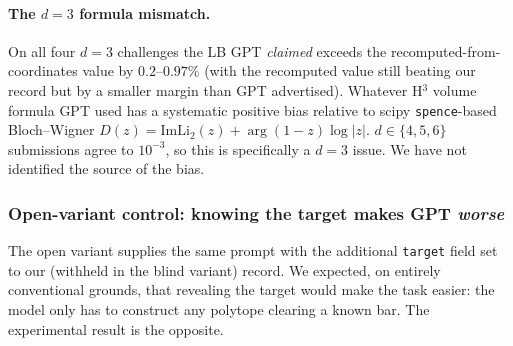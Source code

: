 \documentclass[11pt]{article}
\begin{document}
\paragraph{The $d = 3$ formula mismatch.}
On all four $d = 3$ challenges the LB GPT \emph{claimed} exceeds
the recomputed-from-coordinates value by $0.2$--$0.97\%$ (with
the recomputed value still beating our record but by a smaller
margin than GPT advertised).  Whatever H$^3$ volume formula
GPT used has a systematic positive bias relative to scipy
\texttt{spence}-based Bloch--Wigner $D(z) = \mathrm{Im} \mathrm{Li}_2(z) +
\arg(1{-}z) \log|z|$.  $d \in \{4, 5, 6\}$ submissions agree to
$10^{-3}$, so this is specifically a $d = 3$ issue.  We have not
identified the source of the bias.

\subsubsection{Open-variant control: knowing the target makes GPT \emph{worse}}
\label{sec:open-variant}

The open variant supplies the same prompt with the additional
\texttt{target} field set to our (withheld in the blind variant)
record.  We expected, on entirely conventional grounds, that
revealing the target would make the task easier: the model only
has to construct any polytope clearing a known bar.  The
experimental result is the opposite.
\end{document}
